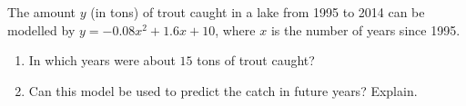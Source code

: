 The amount $y$ (in tons) of trout caught in a lake from 1995 to 2014 can be modelled by $y=-0.08x^2+1.6x+10$, where $x$ is the number of years since 1995.
\begin{enumerate}
\item[(a)] In which years were about $15$ tons of trout caught?
\item[(b)] Can this model be used to predict the catch in future years? Explain.
\end{enumerate}
